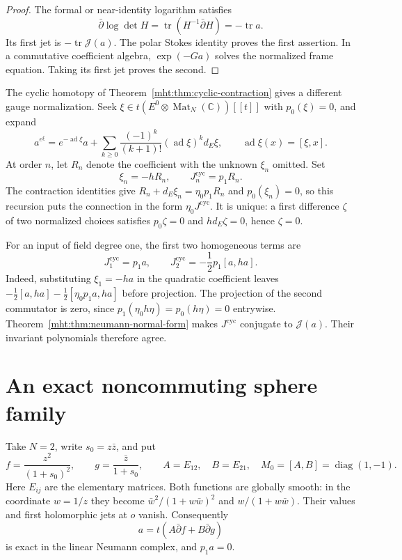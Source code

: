 \begin{proof}
The formal or near-identity logarithm satisfies
\[
 \bar\partial\log\det H
 =\operatorname{tr}(H^{-1}\bar\partial H)=-\operatorname{tr}a.
\]
Its first jet is $-\operatorname{tr}\mathcal J(a)$.
The polar Stokes identity proves the first assertion.
In a commutative coefficient algebra, $\exp(-Ga)$ solves the normalized
frame equation. Taking its first jet proves the second.
\end{proof}

The cyclic homotopy of Theorem~\ref{mht:thm:cyclic-contraction} gives a
different gauge normalization. Seek $\xi\in t(E^0\otimes
\operatorname{Mat}_N(\mathbb C))[[t]]$ with $p_0(\xi)=0$, and expand
\[
 a^{e^\xi}=e^{-\operatorname{ad}\xi}a+
     \sum_{k\geq0}\frac{(-1)^k}{(k+1)!}
                   (\operatorname{ad}\xi)^k d_E\xi,
 \qquad \operatorname{ad}\xi(x)=[\xi,x].
\]
At order $n$, let $R_n$ denote the coefficient with the unknown
$\xi_n$ omitted. Set
\begin{equation}\label{mht:eq:cyclic-slice-recursion}
 \xi_n=-hR_n,\qquad J_n^{\mathrm{cyc}}=p_1R_n.
\end{equation}
The contraction identities give
$R_n+d_E\xi_n=\eta_0p_1R_n$ and $p_0(\xi_n)=0$, so this recursion
puts the connection in the form $\eta_0J^{\mathrm{cyc}}$.
It is unique: a first difference $\zeta$ of two normalized choices
satisfies $p_0\zeta=0$ and $hd_E\zeta=0$, hence $\zeta=0$.

For an input of field degree one, the first two homogeneous terms are
\begin{equation}\label{mht:eq:cyclic-first-terms}
 J_1^{\mathrm{cyc}}=p_1a,\qquad
 J_2^{\mathrm{cyc}}=-\frac12p_1[a,ha].
\end{equation}
Indeed, substituting $\xi_1=-ha$ in the quadratic coefficient leaves
$-\frac12[a,ha]-\frac12[\eta_0p_1a,ha]$ before projection.
The projection of the second commutator is zero, since
$p_1(\eta_0h\eta)=p_0(h\eta)=0$ entrywise.
Theorem~\ref{mht:thm:neumann-normal-form} makes
$J^{\mathrm{cyc}}$ conjugate to $\mathcal J(a)$.
Their invariant polynomials therefore agree.

\section{An exact noncommuting sphere family}

Take $N=2$, write $s_0=z\bar z$, and put
\[
 f=\frac{z^2}{(1+s_0)^2},\qquad
 g=\frac{\bar z}{1+s_0},\qquad
 A=E_{12},\quad B=E_{21},\quad
 M_0=[A,B]=\operatorname{diag}(1,-1).
\]
Here $E_{ij}$ are the elementary matrices. Both functions are globally
smooth: in the coordinate $w=1/z$ they become
$\bar w^2/(1+w\bar w)^2$ and $w/(1+w\bar w)$.
Their values and first holomorphic jets at $o$ vanish. Consequently
\[
 a=t(A\bar\partial f+B\bar\partial g)
\]
is exact in the linear Neumann complex, and $p_1a=0$.

